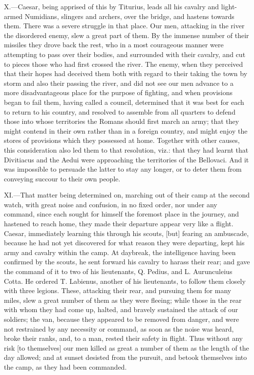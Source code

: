 X.—Caesar, being apprised of this by Titurius, leads all his cavalry
and light-armed Numidians, slingers and archers, over the bridge, and
hastens towards them. There was a severe struggle in that place. Our
men, attacking in the river the disordered enemy, slew a great part of
them. By the immense number of their missiles they drove back the rest,
who in a most courageous manner were attempting to pass over their
bodies, and surrounded with their cavalry, and cut to pieces those who
had first crossed the river. The enemy, when they perceived that their
hopes had deceived them both with regard to their taking the town by
storm and also their passing the river, and did not see our men advance
to a more disadvantageous place for the purpose of fighting, and when
provisions began to fail them, having called a council, determined that
it was best for each to return to his country, and resolved to assemble
from all quarters to defend those into whose territories the Romans
should first march an army; that they might contend in their own rather
than in a foreign country, and might enjoy the stores of provisions
which they possessed at home. Together with other causes, this
consideration also led them to that resolution, viz.: that they had
learnt that Divitiacus and the Aedui were approaching the territories of
the Bellovaci. And it was impossible to persuade the latter to stay any
longer, or to deter them from conveying succour to their own people.

XI.—That matter being determined on, marching out of their camp at the
second watch, with great noise and confusion, in no fixed order, nor
under any command, since each sought for himself the foremost place in
the journey, and hastened to reach home, they made their departure
appear very like a flight. Caesar, immediately learning this through his
scouts, [but] fearing an ambuscade, because he had not yet discovered
for what reason they were departing, kept his army and cavalry within
the camp. At daybreak, the intelligence having been confirmed by the
scouts, he sent forward his cavalry to harass their rear; and gave the
command of it to two of his lieutenants, Q. Pedius, and L. Aurunculeius
Cotta. He ordered T. Labienus, another of his lieutenants, to follow
them closely with three legions. These, attacking their rear, and
pursuing them for many miles, slew a great number of them as they were
fleeing; while those in the rear with whom they had come up, halted, and
bravely sustained the attack of our soldiers; the van, because they
appeared to be removed from danger, and were not restrained by any
necessity or command, as soon as the noise was heard, broke their ranks,
and, to a man, rested their safety in flight. Thus without any risk [to
themselves] our men killed as great a number of them as the length of
the day allowed; and at sunset desisted from the pursuit, and betook
themselves into the camp, as they had been commanded.

